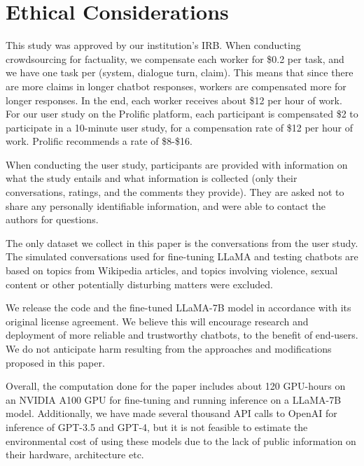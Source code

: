 \section*{Ethical Considerations}

This study was approved by our institution's IRB.
When conducting crowdsourcing for factuality, we compensate each worker for \$0.2 per task, and we have one task per (system, dialogue turn, claim). This means that since there are more claims in longer chatbot responses, workers are compensated more for longer responses. In the end, each worker receives about \$12 per hour of work.
For our user study on the Prolific platform, each participant is compensated \$2 to participate in a 10-minute user study, for a compensation rate of \$12 per hour of work. Prolific recommends a rate of \$8-\$16.

When conducting the user study, participants are provided with information on what the study entails and what information is collected (only their conversations, ratings, and the comments they provide). They are asked not to share any personally identifiable information, and were able to contact the authors for questions.

The only dataset we collect in this paper is the conversations from the user study. The simulated conversations used for fine-tuning LLaMA and testing chatbots are based on topics from Wikipedia articles, and topics involving violence, sexual content or other potentially disturbing matters were excluded.

We release the code and the fine-tuned LLaMA-7B model in accordance with its original license agreement.
We believe this will encourage research and deployment of more reliable and trustworthy chatbots, to the benefit of end-users.
We do not anticipate harm resulting from the approaches and modifications proposed in this paper.

Overall, the computation done for the paper includes about 120 GPU-hours on an NVIDIA A100 GPU for fine-tuning and running inference on a LLaMA-7B model. Additionally, we have made several thousand API calls to OpenAI for inference of GPT-3.5 and GPT-4, but it is not feasible to estimate the environmental cost of using these models due to the lack of public information on their hardware, architecture etc.
